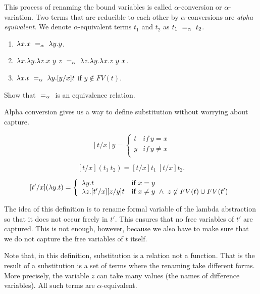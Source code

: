 This process of renaming the bound variables is called
$\alpha$-conversion or $\alpha$-variation.  Two terms that are
reducible to each other by $\alpha$-conversions are \emph{alpha
  equivalent}. We denote $\alpha$-equivalent terms $t_1$ and $t_2$ as
$t_1 ~=_{\alpha}~ t_2$.  

\begin{enumerate}
\item $\lambda x.x ~=_{\alpha}~ \lambda y.y$. 
\item $\lambda x. \lambda y. \lambda z. x ~y~z ~=_{\alpha}~ \lambda z. \lambda y. \lambda x. z~y~x$.
\item $\lambda x.t ~=_{\alpha}~ \lambda y.[y/x]t$ if  $y \not\in FV(t)$.
\end{enumerate}

\begin{exercise}
Show that $~=_{\alpha}~$ is an equivalence relation.
\end{exercise}


Alpha conversion gives us a way to define substitution without
worrying about capture.  
\begin{definition}
\[
[t/x]y = \left\{ \begin{array}{ll}
        t & if~y = x \\
        y & if~y\neq x \\
        \end{array} \right.
\]


\[
[t/x](t_1~t_2) = [t/x]t_1~[t/x]t_2.
 \]



\[[t'/x](\lambda y.t)  =
\left\{ \begin{array}{ll}
        \lambda y.t&\mbox{if}~x = y \\
        \lambda z. [t'/x] [z/y] t
        &\mbox{if}~ x \not= y ~ \land ~ z \not\in FV(t) \cup FV(t') \\
       \end{array} \right. \]
\end{definition}

The idea of this definition is to rename formal variable of the lambda
abstraction so that it does not occur freely in $t'$.  This ensures
that no free variables of $t'$ are captured.  This is not enough,
however, because we also have to make sure that we do not capture the
free variables of $t$ itself. 

Note that, in this definition, substitution is a relation not a
function.  That is the result of a substitution is a set of terms
where the renaming take different forms.  More precisely, the variable
$z$ can take many values (the names of difference variables).  All
such terms are $\alpha$-equivalent. 

